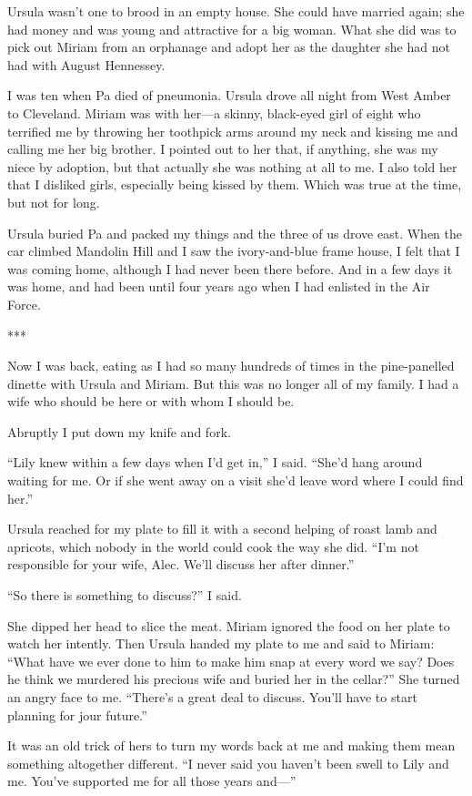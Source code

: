 \documentclass{novel}
\begin{document}
{Ursula wasn’t one to brood in an empty house. She could have married again; she had money and was young and attractive for a big woman. What she did was to pick out Miriam from an orphanage and adopt her as the daughter she had not had with August Hennessey.

I was ten when Pa died of pneumonia. Ursula drove all night from West Amber to Cleveland. Miriam was with her—a skinny, black-eyed girl of eight who terrified me by throwing her toothpick arms around my neck and kissing me and calling me her big brother. I pointed out to her that, if anything, she was my niece by adoption, but that actually she was nothing at all to me. I also told her that I disliked girls, especially being kissed by them. Which was true at the time, but not for long.

Ursula buried Pa and packed my things and the three of us drove east. When the car climbed Mandolin Hill and I saw the ivory-and-blue frame house, I felt that I was coming home, although I had never been there before. And in a few days it was home, and had been until four years ago when I had enlisted in the Air Force.

***

Now I was back, eating as I had so many hundreds of times in the pine-panelled dinette with Ursula and Miriam. But this was no longer all of my family. I had a wife who should be here or with whom I should be.

Abruptly I put down my knife and fork.

“Lily knew within a few days when I’d get in,” I said. “She’d hang around waiting for me. Or if she went away on a visit she’d leave word where I could find her.”

Ursula reached for my plate to fill it with a second helping of roast lamb and apricots, which nobody in the world could cook the way she did. “I’m not responsible for your wife, Alec. We’ll discuss her after dinner.”

“So there is something to discuss?” I said.

She dipped her head to slice the meat. Miriam ignored the food on her plate to watch her intently. Then Ursula handed my plate to me and said to Miriam: “What have we ever done to him to make him snap at every word we say? Does he think we murdered his precious wife and buried her in the cellar?” She turned an angry face to me. “There’s a great deal to discuss. You’ll have to start planning for jour future.”

It was an old trick of hers to turn my words back at me and making them mean something altogether different. “I never said you haven’t been swell to Lily and me. You’ve supported me for all those years and—”

}
\end{document}
